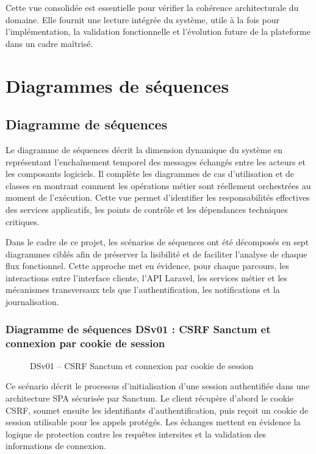 Cette vue consolidée est essentielle pour vérifier la cohérence architecturale du domaine. Elle fournit une lecture intégrée du système, utile à la fois pour l'implémentation, la validation fonctionnelle et l'évolution future de la plateforme dans un cadre maîtrisé.

\newpage
\section{Diagrammes de séquences}

\subsection{Diagramme de séquences}

Le diagramme de séquences décrit la dimension dynamique du système en représentant l'enchaînement temporel des messages échangés entre les acteurs et les composants logiciels. Il complète les diagrammes de cas d'utilisation et de classes en montrant comment les opérations métier sont réellement orchestrées au moment de l'exécution. Cette vue permet d'identifier les responsabilités effectives des services applicatifs, les points de contrôle et les dépendances techniques critiques.

Dans le cadre de ce projet, les scénarios de séquences ont été décomposés en sept diagrammes ciblés afin de préserver la lisibilité et de faciliter l'analyse de chaque flux fonctionnel. Cette approche met en évidence, pour chaque parcours, les interactions entre l'interface cliente, l'API Laravel, les services métier et les mécanismes transversaux tels que l'authentification, les notifications et la journalisation.

\newpage
\subsubsection{Diagramme de séquences DSv01 : CSRF Sanctum et connexion par cookie de session}

\begin{figure}[H]
  \centering
  
  \caption{DSv01 -- CSRF Sanctum et connexion par cookie de session}
  \label{fig:dseq_dsv01}
\end{figure}

Ce scénario décrit le processus d'initialisation d'une session authentifiée dans une architecture SPA sécurisée par Sanctum. Le client récupère d'abord le cookie CSRF, soumet ensuite les identifiants d'authentification, puis reçoit un cookie de session utilisable pour les appels protégés. Les échanges mettent en évidence la logique de protection contre les requêtes intersites et la validation des informations de connexion.

